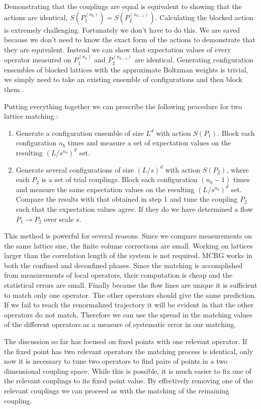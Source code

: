 Demonstrating that the couplings are equal is equivalent to showing that the actions are identical, $S(P_1^{(n_b)})=S(P_2^{(n_{b-1})})$.
Calculating the blocked action is extremely challenging. 
Fortunately we don't have to do this.
We are saved because we don't need to know the exact form of the actions to demonstrate that they are equivalent.
Instead we can show that expectation values of every operator measured on $P_1^{(n_b)}$ and $P_2^{(n_{b-1})}$ are identical.
Generating configuration ensembles of blocked lattices with the approximate Boltzman weights is trivial, we simply need to take an existing ensemble of configurations and then block them \cite{Swendsen:1979}.

Putting everything together we can prescribe the following procedure for two lattice matching \cite{Hasenfratz:2009}:
\begin{enumerate}
  \item Generate a configuration ensemble of size $L^d$ with action $S(P_1)$. Block each configuration $n_b$ times and measure a set of expectation values on the resulting $(L/s^{n_b})^d$ set.
  \item Generate several configurations of size $(L/s)^d$ with action $S(P_2)$, where each $P_2$ is a set of trial couplings. Block each configuration $(n_b-1)$ times and measure the same expectation values on the resulting $(L/s^{n_b})^d$ set. Compare the results with that obtained in step 1 and tune the coupling $P_2$ such that the expectation values agree. If they do we have determined a flow $P_1\rightarrow P_2$ over scale $s$.
\end{enumerate}

This method is powerful for several reasons.
Since we compare measurements on the same lattice size, the finite volume corrections are small.
Working on lattices larger than the correlation length of the system is not required.
MCRG works in both the confined and deconfined phases.
Since the matching is accomplished from measurements of local operators, their computation is cheap and the statistical errors are small.
Finally because the flow lines are unique it is sufficient to match only one operator.
The other operators should give the same prediction.
If we fail to reach the renormalized trajectory it will be evident in that the other operators do not match.
Therefore we can use the spread in the matching values of the different operators as a measure of systematic error in our matching.

The discussion so far has focused on fixed points with one relevant operator.
If the fixed point has two relevant operators the matching process is identical, only now it is necessary to tune two operators to find pairs of points in a two dimensional coupling space.
While this is possible, it is much easier to fix one of the relevant couplings to its fixed point value.
By effectively removing one of the relevant couplings we can proceed as with the matching of the remaining coupling.

